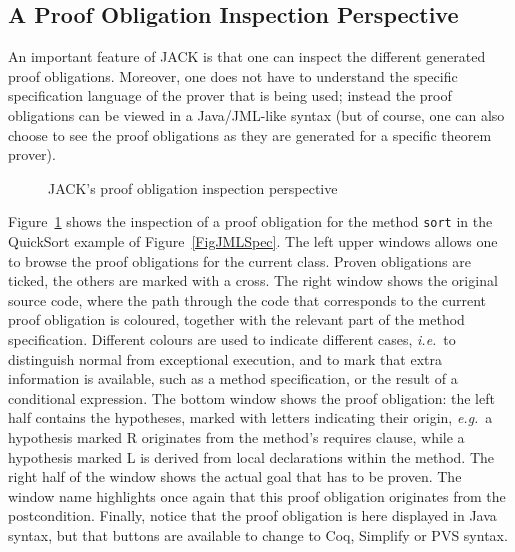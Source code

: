 \subsection{A Proof Obligation Inspection Perspective}

An important feature of JACK is that one can inspect the different
generated proof obligations. Moreover, one does not have to understand
the specific specification language of the prover that is being used;
instead the proof obligations can be viewed in a Java/JML-like syntax
(but of course, one can also choose to see the proof obligations as
they are generated for a specific theorem prover).

\begin{figure}[t!]
\caption{JACK's proof obligation inspection perspective}\label{FigJackPerspective}
\end{figure}


Figure~\ref{FigJackPerspective} shows the inspection of a proof obligation
for the method \texttt{sort} in the QuickSort example of
Figure~\ref{FigJMLSpec}. The left upper windows allows one to browse
the proof obligations for the current class. Proven obligations are
ticked, the others are marked with a cross. The right window shows the
original source code, where the path through the code that corresponds
to the current proof obligation is coloured, together with the
relevant part of the method specification. Different colours are used
to indicate different cases, \emph{i.e.}\ to distinguish normal from
exceptional execution, and to mark that extra information is
available, such as a method specification, or the result of a
conditional expression.  The bottom window shows the proof obligation:
the left half contains the hypotheses, marked with letters indicating
their origin, \emph{e.g.}\ a hypothesis marked R originates from the
method's requires clause, while a hypothesis marked L is derived from
local declarations within the method. The right half of the window
shows the actual goal that has to be proven. The window name
highlights once again that this proof obligation originates from the
postcondition. Finally, notice that the proof obligation is here
displayed in Java syntax, but that buttons are available to change to
Coq, Simplify or PVS syntax.

